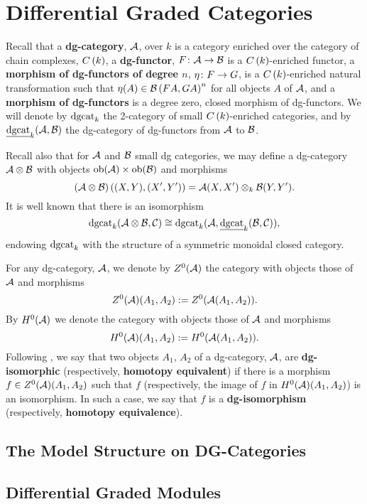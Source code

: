 \chapter{Differential Graded Categories}\label{section: background on dgcats}
Recall that a \textbf{dg-category}, \(\mathcal{A}\), over \(k\) is a category enriched over the category of chain complexes, \(C\left(k\right)\), a \textbf{dg-functor}, \(F \colon \mathcal{A} \rightarrow \mathcal{B}\) is a \(C\left(k\right)\)-enriched functor, a \textbf{morphism of dg-functors of degree \(n\)}, \(\eta \colon F \rightarrow G\), is a \(C\left(k\right)\)-enriched natural transformation such that \(\eta(A) \in \mathcal{B}\left(FA, GA\right)^n\) for all objects \(A\) of \(\mathcal {\mathcal{A}}\), and a \textbf{morphism of dg-functors} is a degree zero, closed morphism of dg-functors.
We will denote by \(\operatorname{dgcat}_k\) the 2-category of small \(C\left(k\right)\)-enriched categories, and by \(\underline{\operatorname{dgcat}}_{k}(\mathcal{A},\mathcal{B})\) the dg-category of dg-functors from \(\mathcal{A}\) to \(\mathcal{B}\).

Recall also that for \(\mathcal{A}\) and \(\mathcal{B}\) small dg categories, we may define a dg-category \(\mathcal{A} \otimes \mathcal{B}\) with objects \(\operatorname{ob}(\mathcal{A}) \times \operatorname{ob}(\mathcal{B})\) and morphisms
\[(\mathcal{A} \otimes \mathcal{B})\left((X,Y), (X^\prime,Y^\prime)\right) = \mathcal{A}(X,X^\prime) \otimes_k \mathcal{B}(Y, Y^\prime).\]
It is well known that there is an isomorphism
\[\operatorname{dgcat}_k(\mathcal{A} \otimes \mathcal{B}, \mathcal{C}) \cong \operatorname{dgcat}_k(\mathcal{A}, \underline{\operatorname{dgcat}}_{k}(\mathcal{B}, \mathcal{C})),\]
endowing \(\operatorname{dgcat}_k\) with the structure of a symmetric monoidal closed category.

For any dg-category, \(\mathcal{A}\), we denote by \(Z^0(\mathcal{A})\) the category with objects those of \(\mathcal{A}\) and morphisms
\[Z^0(\mathcal{A})(A_1, A_2) := Z^0(\mathcal{A}(A_1,A_2)).\]
By \(H^0(\mathcal{A})\) we denote the category with objects those of \(\mathcal{A}\) and morphisms
\[H^0(\mathcal{A})(A_1, A_2) := H^0(\mathcal{A}(A_1,A_2)).\]
Following \parencite{CS15}, we say that two objects \(A_1\), \(A_2\) of a dg-category, \(\mathcal{A}\), are \textbf{dg-isomorphic} (respectively, \textbf{homotopy equivalent}) if there is a morphism \(f \in Z^0(\mathcal{A})(A_1, A_2)\) such that \(f\) (respectively, the image of \(f\) in \(H^0(\mathcal{A})(A_1, A_2)\)) is an isomorphism.
In such a case, we say that \(f\) is a \textbf{dg-isomorphism} (respectively, \textbf{homotopy equivalence}).

\section{The Model Structure on DG-Categories}


\section{Differential Graded Modules}\label{subsection: dg modules}


